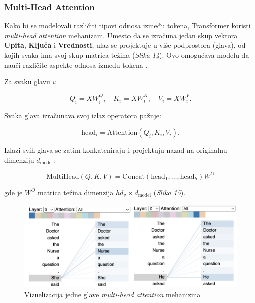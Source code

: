 \documentclass[12pt]{article}
\begin{document}
   \subsubsection*{Multi-Head Attention}
   Kako bi se modelovali različiti tipovi odnosa između tokena, Transformer koristi 
   \textit{multi-head attention} mehanizam. Umesto da se izračuna jedan skup vektora 
   \textbf{Upita}, \textbf{Ključa} i \textbf{Vrednosti}, ulaz se projektuje u više 
   podprostora (glava), od kojih svaka ima svoj skup matrica težina (\textit{Slika 14}). Ovo omogućava modelu da 
   nauči različite aspekte odnosa između tokena \cite{trans_exp}.

   Za svaku glavu \( i \):

   \[
   Q_i = XW_i^Q, \quad K_i = XW_i^K, \quad V_i = XW_i^V.
   \]

   Svaka glava izračunava svoj izlaz operatora pažnje:

   \[
   \text{head}_i = \text{Attention}(Q_i, K_i, V_i).
   \]

   Izlazi svih glava se zatim konkateniraju i projektuju nazad na originalnu 
   dimenziju \( d_{\text{model}} \):

   \[
   \text{MultiHead}(Q, K, V) = \text{Concat}(\text{head}_1, \dots, \text{head}_h)W^O
   \]

   gde je \( W^O \) matrica težina dimenzija \( hd_v \times d_{\text{model}} \) (\textit{Slika 15}).

   \begin{figure}[h!]
      \centering
      \vspace{0.5cm} %
      \includegraphics[width=1\textwidth]{attention_head.png}
      \caption{Vizuelizacija jedne glave \textit{multi-head attention} mehanizma \cite{attention_head}}
      \label{fig:attention_head}
   \end{figure}
\end{document}
